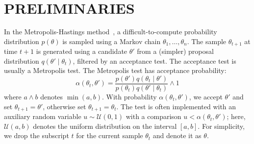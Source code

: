 \documentclass[twoside]{article} \usepackage{aistats2017}
\begin{document}
\section{PRELIMINARIES}\label{sec:related_work}

In the Metropolis-Hastings method~\citep{gilks1996markov,brooks2011handbook}, a
difficult-to-compute probability distribution $p(\theta)$ is sampled using a
Markov chain $\theta_1,\ldots,\theta_n$. The sample $\theta_{t+1}$ at time $t+1$
is generated using a candidate $\theta'$ from a (simpler) proposal distribution
$q(\theta'\mid \theta_t)$, filtered by an acceptance test. The acceptance test
is usually a Metropolis test. The Metropolis test has acceptance probability:
\begin{equation}\label{eq:traditional}
    \alpha(\theta_t,\theta') = \frac{p(\theta')q(\theta_t \mid \theta')}{p(\theta_t)q(\theta' \mid \theta_t)} \wedge 1
\end{equation}
where $a \wedge b$ denotes $\min(a,b)$.  With probability
$\alpha(\theta_t,\theta')$, we accept $\theta'$ and set $\theta_{t+1} =
\theta'$, otherwise set $\theta_{t+1}=\theta_t$.  The test is often implemented
with an auxiliary random variable $u \sim \mathcal{U}(0,1)$ with a comparison
$u<\alpha(\theta_t,\theta')$; here, $\mathcal{U}(a,b)$ denotes the uniform
distribution on the interval $[a,b]$.  For simplicity, we drop the subscript $t$
for the current sample $\theta_t$ and denote it as $\theta$. 
\end{document}
